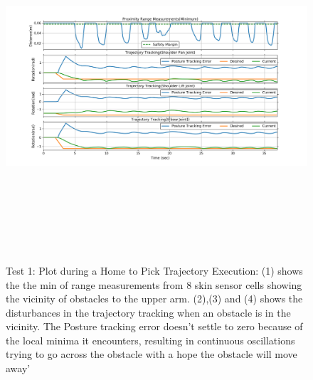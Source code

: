 \begin{figure}[H]
\centering
\includegraphics[width=18cm,height=13cm,center]{chapters/doa/images/delft/test_home2pick/plot_0.png}
\caption{Test 1: Plot during a Home to Pick Trajectory Execution: (1) shows the the min of range measurements from 8 skin sensor cells showing the vicinity of obstacles to the upper arm. (2),(3) and (4) shows the disturbances in the trajectory tracking when an obstacle is in the vicinity. The Posture tracking error doesn't settle to zero because of the local minima it encounters, resulting in continuous oscillations trying to go across the obstacle with a hope the obstacle will move away'}
\label{Home2Pick:test1}
\end{figure}
